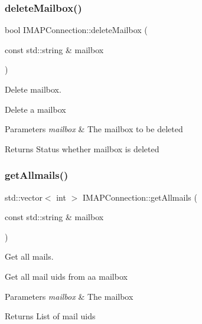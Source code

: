 \subsubsection{\texorpdfstring{delete\+Mailbox()}{deleteMailbox()}}
{\footnotesize\ttfamily bool I\+M\+A\+P\+Connection\+::delete\+Mailbox (\begin{DoxyParamCaption}\item[{const std\+::string \&}]{mailbox }\end{DoxyParamCaption})}



Delete mailbox. 

Delete a mailbox


\begin{DoxyParams}{Parameters}
{\em mailbox} & The mailbox to be deleted\\
\hline
\end{DoxyParams}
\begin{DoxyReturn}{Returns}
Status whether mailbox is deleted 
\end{DoxyReturn}
\mbox{\label{classIMAPConnection_a88d3b9b7821ad6f2a09874015f8a9cfe}} 
\subsubsection{\texorpdfstring{get\+Allmails()}{getAllmails()}}
{\footnotesize\ttfamily std\+::vector$<$ int $>$ I\+M\+A\+P\+Connection\+::get\+Allmails (\begin{DoxyParamCaption}\item[{const std\+::string \&}]{mailbox }\end{DoxyParamCaption})}



Get all mails. 

Get all mail uids from aa mailbox


\begin{DoxyParams}{Parameters}
{\em mailbox} & The mailbox \\
\hline
\end{DoxyParams}
\begin{DoxyReturn}{Returns}
List of mail uids 
\end{DoxyReturn}
\mbox{\label{classIMAPConnection_a4c93cce25ad9fe1e0ab3950576cdab30}} 
